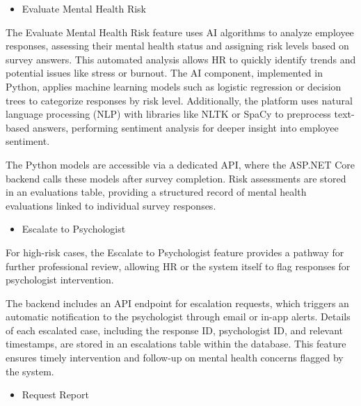 \documentclass[conference]{IEEEtran}
\begin{document}
    \begin{itemize}
        \item Evaluate Mental Health Risk
    \end{itemize}
    
    The Evaluate Mental Health Risk feature uses AI algorithms to 
    analyze employee responses, assessing their mental health status 
    and assigning risk levels based on survey answers. This automated
     analysis allows HR to quickly identify trends and potential 
     issues like stress or burnout. The AI component, implemented 
     in Python, applies machine learning models such as logistic 
     regression or decision trees to categorize responses by risk 
     level. Additionally, the platform uses natural language 
     processing (NLP) with libraries like NLTK or SpaCy to preprocess 
     text-based answers, performing sentiment analysis for deeper 
     insight into employee sentiment. \newline
     
     The Python models are 
     accessible via a dedicated API, where the ASP.NET Core 
     backend calls these models after survey completion. Risk 
     assessments are stored in an evaluations table, providing a 
     structured record of mental health evaluations linked to 
     individual survey responses.
     \newline    

     \begin{itemize}
        \item Escalate to Psychologist
    \end{itemize}
    
    For high-risk cases, the Escalate to Psychologist feature 
    provides a pathway for further professional review, allowing 
    HR or the system itself to flag responses for psychologist 
    intervention.
    \newline
    
    The backend includes an API endpoint 
    for escalation requests, which triggers an automatic 
    notification to the psychologist through email or in-app 
    alerts. Details of each escalated case, including the response
    ID, psychologist ID, and relevant timestamps, are stored in an
    escalations table within the database. This feature ensures 
    timely intervention and follow-up on mental health concerns
    flagged by the system.
    \newline    

     \begin{itemize}
        \item Request Report
    \end{itemize}
    
\end{document}
